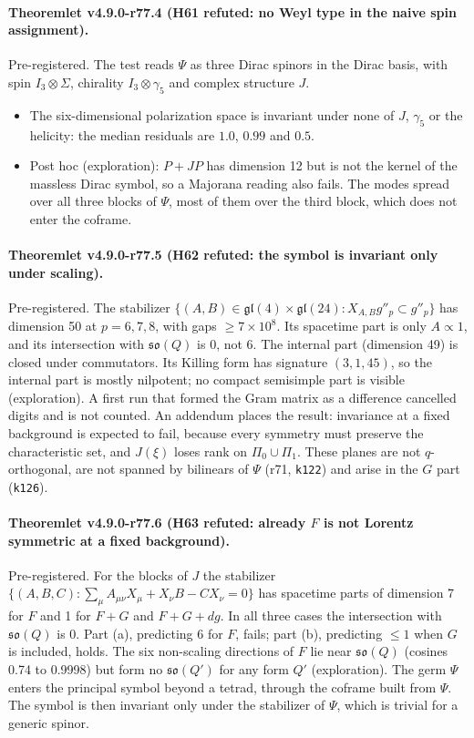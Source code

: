 \paragraph{Theoremlet v4.9.0-r77.4 (H61 refuted: no Weyl type in the naive spin assignment).}
Pre-registered.  The test reads \(\Psi\) as three Dirac spinors in the Dirac basis, with spin \(I_3\otimes\Sigma\), chirality
\(I_3\otimes\gamma_5\) and complex structure \(J\).
\begin{itemize}[leftmargin=2em]
\item The six-dimensional polarization space is invariant under none of \(J\), \(\gamma_5\) or the helicity: the median
residuals are \(1.0\), \(0.99\) and \(0.5\).
\item Post hoc (exploration): \(P+JP\) has dimension 12 but is not the kernel of the massless Dirac symbol, so a Majorana
reading also fails.  The modes spread over all three blocks of \(\Psi\), most of them over the third block, which does not
enter the coframe.
\end{itemize}

\paragraph{Theoremlet v4.9.0-r77.5 (H62 refuted: the symbol is invariant only under scaling).}
Pre-registered.  The stabilizer
\(\{(A,B)\in\mathfrak{gl}(4)\times\mathfrak{gl}(24):X_{A,B}g''_p\subset g''_p\}\) has dimension 50 at \(p=6,7,8\), with gaps
\(\ge7\times10^8\).  Its spacetime part is only \(A\propto1\), and its intersection with \(\mathfrak{so}(Q)\) is 0, not 6.  The
internal part (dimension 49) is closed under commutators.  Its Killing form has signature \((3,1,45)\), so the internal part
is mostly nilpotent; no compact semisimple part is visible (exploration).  A first run that formed the Gram matrix as a
difference cancelled digits and is not counted.  An addendum places the result: invariance at a fixed background is expected
to fail, because every symmetry must preserve the characteristic set, and \(J(\xi)\) loses rank on \(\Pi_0\cup\Pi_1\).  These
planes are not \(q\)-orthogonal, are not spanned by bilinears of \(\Psi\) (r71, \texttt{k122}) and arise in the \(G\) part
(\texttt{k126}).

\paragraph{Theoremlet v4.9.0-r77.6 (H63 refuted: already \(F\) is not Lorentz symmetric at a fixed background).}
Pre-registered.  For the blocks of \(J\) the stabilizer
\(\{(A,B,C):\sum_\mu A_{\mu\nu}X_\mu+X_\nu B-CX_\nu=0\}\) has spacetime parts of dimension 7 for \(F\) and 1 for \(F+G\) and
\(F+G+dg\).  In all three cases the intersection with \(\mathfrak{so}(Q)\) is 0.  Part (a), predicting 6 for \(F\), fails;
part (b), predicting \(\le1\) when \(G\) is included, holds.  The six non-scaling directions of \(F\) lie near
\(\mathfrak{so}(Q)\) (cosines 0.74 to 0.9998) but form no \(\mathfrak{so}(Q')\) for any form \(Q'\) (exploration).  The germ
\(\Psi\) enters the principal symbol beyond a tetrad, through the coframe built from \(\Psi\).  The symbol is then invariant
only under the stabilizer of \(\Psi\), which is trivial for a generic spinor.

